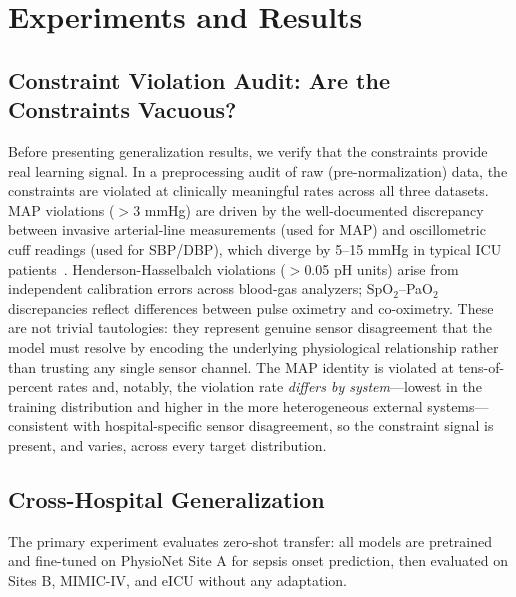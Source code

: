 \documentclass{article}
\begin{document}
\section{Experiments and Results}
\label{sec:results}

\subsection{Constraint Violation Audit: Are the Constraints Vacuous?}
\label{sec:audit}

Before presenting generalization results, we verify that the constraints provide real learning signal.
In a preprocessing audit of raw (pre-normalization) data, the constraints are violated at clinically meaningful rates across all three datasets.
MAP violations ($>$3 mmHg) are driven by the well-documented discrepancy between invasive arterial-line measurements (used for MAP) and oscillometric cuff readings (used for SBP/DBP), which diverge by 5--15 mmHg in typical ICU patients~\citep{wax2011invasive}.
Henderson-Hasselbalch violations ($>$0.05 pH units) arise from independent calibration errors across blood-gas analyzers; SpO$_2$--PaO$_2$ discrepancies reflect differences between pulse oximetry and co-oximetry.
These are not trivial tautologies: they represent genuine sensor disagreement that the model must resolve by encoding the underlying physiological relationship rather than trusting any single sensor channel.
The MAP identity is violated at tens-of-percent rates and, notably, the violation rate \emph{differs by system}---lowest in the training distribution and higher in the more heterogeneous external systems---consistent with hospital-specific sensor disagreement, so the constraint signal is present, and varies, across every target distribution.

\subsection{Cross-Hospital Generalization}
\label{sec:exp1}

The primary experiment evaluates zero-shot transfer: all models are pretrained and fine-tuned on PhysioNet Site A for sepsis onset prediction, then evaluated on Sites B, MIMIC-IV, and eICU without any adaptation.
\end{document}
